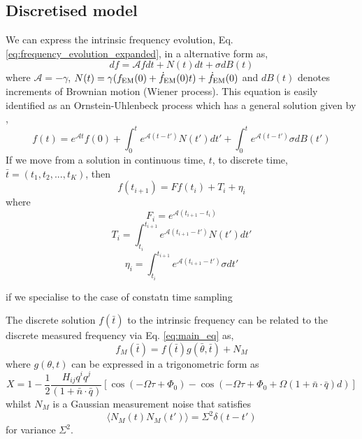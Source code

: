 \documentclass[fleqn,usenatbib,useAMS]{mnras}
\begin{document}
\subsection{Discretised model} \label{sec:statespace}
We can express the intrinsic frequency evolution, Eq. \ref{eq:frequency_evolution_expanded}, in a alternative form as,
\begin{equation}
	df = \mathcal{A} f dt + N(t) dt + \sigma dB(t)
	\label{eq:state1}
\end{equation}
where $\mathcal{A} = -\gamma$, $N(t) = \gamma(f_{\rm EM}(0) + \dot{f}_{\rm EM}(0) t) +\dot{f}_{\rm EM}(0)$ and $dB(t)$ denotes increments of Brownian motion (Wiener process). This equation is easily identified as an Ornstein-Uhlenbeck process which has a general solution given by \citep{gardiner2009stochastic},
\begin{equation}
	f(t) = e^{\mathcal{A}t}f(0) + \int_0^t e^{\mathcal{A}(t-t')} N(t') dt' + \int_0^t e^{\mathcal{A}(t-t')} \sigma dB(t')
\end{equation} 
If we move from a solution in continuous time, $t$, to discrete time, $\bar{t} = (t_1, t_2, ...,t_K)$, then
\begin{equation}
	f(t_{i+1}) = F f(t_i) + T_i + \eta_i
\end{equation}
where
\begin{equation}
	F_i = e^{\mathcal{A} (t_{i+1} - t_i)}
\end{equation}
\begin{equation}
	T_i = \int_{t_i}^{t_{i+1}}  e^{\mathcal{A} (t_{i+1} - t')} N(t') dt'
\end{equation}
\begin{equation}
	\eta_i = \int_{t_i}^{t_{i+1}}  e^{\mathcal{A} (t_{i+1} - t')} \sigma dt'
\end{equation}

if we specialise to the case of constatn time sampling 






The discrete solution $f(\bar{t})$ to the intrinsic frequency can be related to the discrete measured frequency via Eq. \ref{eq:main_eq} as,
\begin{equation}
	f_M (\bar{t})= f(\bar{t}) g(\bar{\theta},\bar{t}) + N_M
\end{equation}
where $g(\theta,t)$ can be expressed in a trigonometric form as 
\begin{equation}
		X = 1 - \frac{1}{2} \frac{ H_{ij}q^i q^j }{(1 + \bar{n}\cdot \bar{q}) } \left[ \cos(-\Omega \tau +\Phi_0) - \cos(-\Omega \tau +\Phi_0 + \Omega (1 + \bar{n}\cdot \bar{q})  d) \right]
\end{equation} 
whilst $N_M$ is a Gaussian measurement noise that satisfies 
\begin{equation}
	\langle N_M(t) N_M(t') \rangle = \Sigma^2 \delta(t - t')
\end{equation}
for variance $\Sigma^2$. 
\end{document}
